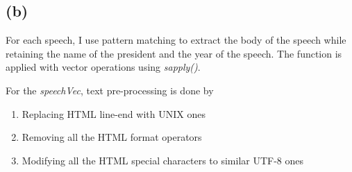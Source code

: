 \documentclass{article}
\begin{document}
\subsection*{(b)}

For each speech, I use pattern matching to extract the body of the speech while retaining 
the name of the president and the year of the speech. The function is applied with vector
operations using \textit{sapply()}.

For the \textit{speechVec}, text pre-processing is done by 
\begin{enumerate}
\item
Replacing HTML line-end with UNIX ones 
\item
Removing all the HTML format operators
\item
Modifying all the HTML special characters to similar UTF-8 ones
\end{enumerate}
\end{document}
